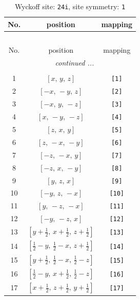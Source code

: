 \documentclass[fleqn,8pt]{jsarticle}
\begin{document}
\begin{longtable}{ccc}
\caption{Wyckoff site: {\tt 24i}, site symmetry: {\tt 1}}
 \\
 \hline \hline
No. & position & mapping \\ \hline \endfirsthead

\multicolumn{2}{l}{\tablename\ \thetable{}} \\
 \hline \hline
No. & position & mapping \\ \hline \endhead

 \hline \hline
\multicolumn{2}{r}{\footnotesize\it continued ...} \\ \endfoot

 \hline \hline
\multicolumn{2}{r}{} \\ \endlastfoot

1 & $\left[ x,\, y,\, z \right]$ & {\tt [1]} \\ \hline
2 & $\left[ - x,\, - y,\, z \right]$ & {\tt [2]} \\ \hline
3 & $\left[ - x,\, y,\, - z \right]$ & {\tt [3]} \\ \hline
4 & $\left[ x,\, - y,\, - z \right]$ & {\tt [4]} \\ \hline
5 & $\left[ z,\, x,\, y \right]$ & {\tt [5]} \\ \hline
6 & $\left[ z,\, - x,\, - y \right]$ & {\tt [6]} \\ \hline
7 & $\left[ - z,\, - x,\, y \right]$ & {\tt [7]} \\ \hline
8 & $\left[ - z,\, x,\, - y \right]$ & {\tt [8]} \\ \hline
9 & $\left[ y,\, z,\, x \right]$ & {\tt [9]} \\ \hline
10 & $\left[ - y,\, z,\, - x \right]$ & {\tt [10]} \\ \hline
11 & $\left[ y,\, - z,\, - x \right]$ & {\tt [11]} \\ \hline
12 & $\left[ - y,\, - z,\, x \right]$ & {\tt [12]} \\ \hline
13 & $\left[ y + \frac{1}{2},\, x + \frac{1}{2},\, z + \frac{1}{2} \right]$ & {\tt [13]} \\ \hline
14 & $\left[ \frac{1}{2} - y,\, \frac{1}{2} - x,\, z + \frac{1}{2} \right]$ & {\tt [14]} \\ \hline
15 & $\left[ y + \frac{1}{2},\, \frac{1}{2} - x,\, \frac{1}{2} - z \right]$ & {\tt [15]} \\ \hline
16 & $\left[ \frac{1}{2} - y,\, x + \frac{1}{2},\, \frac{1}{2} - z \right]$ & {\tt [16]} \\ \hline
17 & $\left[ x + \frac{1}{2},\, z + \frac{1}{2},\, y + \frac{1}{2} \right]$ & {\tt [17]} \\ \hline

\end{longtable}
\end{document}
